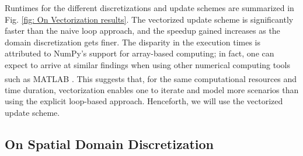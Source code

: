 \documentclass{article}
\begin{document}
Runtimes for the different discretizations and update schemes are summarized in Fig. \ref{fig: On Vectorization results}.
The vectorized update scheme is significantly faster than the naive loop approach,
and the speedup gained increases as the domain discretization gets finer.
The disparity in the execution times is attributed to NumPy's support for array-based computing;
in fact, one can expect to arrive at similar findings when using other numerical computing tools such as
MATLAB\textsuperscript{\textregistered} \citep{MATLABR2020b}.
This suggests that, for the same computational resources and time duration,
vectorization enables one to iterate and model more scenarios
than using the explicit loop-based approach.
Henceforth, we will use the vectorized update scheme.

\subsection{On Spatial Domain Discretization}
\label{subsec: On Spatial Domain Discretization}
\end{document}

